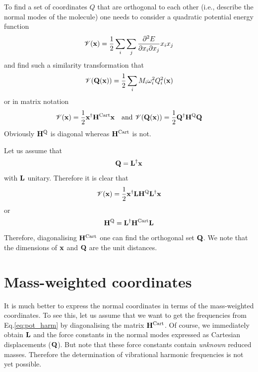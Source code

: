 \documentclass[a4paper,titlepage,twoside,fleqn,12pt]{book}
\begin{document}
\begin{appendices}
To find a set of coordinates $Q$ that are orthogonal to each other (i.e., describe the normal 
modes of the molecule) one needs to consider a quadratic potential energy function
\begin{equation}
\mathscr{V}({\bf x}) = \frac{1}{2} \sum_i\sum_j \frac{\partial^2 E}{\partial x_i \partial x_j} x_i x_j
\end{equation}
and find such a similarity transformation that
\begin{equation}\label{eq:pot_harm}
\mathscr{V}({\bf Q}({\bf x})) = \frac{1}{2} \sum_i M_i \omega_i^2 Q_i^2({\bf x})
\end{equation}
or in matrix notation
\begin{equation}
\mathscr{V}({\bf x}) = \frac{1}{2} {\bf x}^{\dagger} {\bf H}^{\rm Cart} {\bf x}  
\quad \textrm{and   } \mathscr{V}({\bf Q}({\bf x})) = \frac{1}{2} {\bf Q}^{\dagger} {\bf H}^{\rm Q} {\bf Q} 
\end{equation}
Obviously ${\bf H}^{\rm Q}$ is diagonal whereas ${\bf H}^{\rm Cart}$ is not. 

Let us assume that
\begin{equation}
{\bf Q} = {\bf L}^{\dagger} {\bf x}
\end{equation}
with ${\bf L}$ unitary.
Therefore it is clear that
\begin{equation}
\mathscr{V}({\bf x}) = \frac{1}{2} {\bf x}^{\dagger} {\bf L} {\bf H}^{\rm Q} {\bf L}^{\dagger} {\bf x}
\end{equation}
or
\begin{equation}
{\bf H}^{\rm Q} = {\bf L}^{\dagger} {\bf H}^{\rm Cart} {\bf L}
\end{equation}
Therefore, diagonalising ${\bf H}^{\rm Cart}$ one can find the orthogonal 
set ${\bf Q}$. We note that the dimensions of ${\bf x}$ and ${\bf Q}$ are the unit distances.

\section{Mass-weighted coordinates\label{a:mw-coord}}

It is much better to express the normal coordinates in terms of the mass\hyp{}weighted coordinates.
To see this, let us assume that we want to get the frequencies from Eq.\eqref{eq:pot_harm} by diagonalising
the matrix ${\bf H}^{\rm Cart}$. Of course, we immediately obtain ${\bf L}$ and the force constants
in the normal modes expressed as Cartesian displacements (${\bf Q}$). But note that these force constants 
contain \emph{unknown} reduced masses.
Therefore the determination of vibrational harmonic frequencies is not yet possible. 


\end{appendices}
\end{document}
